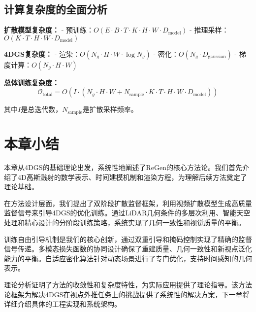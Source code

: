 \subsection{计算复杂度的全面分析}

\textbf{扩散模型复杂度：}
- 预训练：$O(E \cdot B \cdot T \cdot K \cdot H \cdot W \cdot D_{\text{model}})$
- 推理采样：$O(K \cdot T \cdot H \cdot W \cdot D_{\text{model}})$

\textbf{4DGS复杂度：}
- 渲染：$O(N_g \cdot H \cdot W \cdot \log N_g)$
- 密化：$O(N_g \cdot D_{\text{gaussian}})$
- 梯度计算：$O(N_g \cdot H \cdot W)$

\textbf{总体训练复杂度：}
\begin{equation}
\mathcal{O}_{\text{total}} = O(I \cdot (N_g \cdot H \cdot W + N_{\text{sample}} \cdot K \cdot T \cdot H \cdot W \cdot D_{\text{model}}))
\label{eq:total_complexity}
\end{equation}

其中$I$是总迭代数，$N_{\text{sample}}$是扩散采样频率。

\section{本章小结}

本章从4DGS的基础理论出发，系统性地阐述了ReGen的核心方法论。我们首先介绍了4D高斯溅射的数学表示、时间建模机制和渲染方程，为理解后续方法奠定了理论基础。

在方法设计层面，我们提出了双阶段扩散监督框架，利用视频扩散模型生成高质量监督信号来引导4DGS的优化训练。通过LiDAR几何条件的多层次利用、智能天空处理和精心设计的分阶段训练策略，系统实现了几何一致性和视觉质量的平衡。

训练自由引导机制是我们的核心创新，通过双重引导和掩码控制实现了精确的监督信号传递。多模态损失函数的协同设计确保了重建质量、几何一致性和新视点泛化能力的平衡。自适应密化算法针对动态场景进行了专门优化，支持时间感知的几何表示。

理论分析证明了方法的收敛性和复杂度特性，为实际应用提供了理论指导。该方法论框架为解决4DGS在视点外推任务上的挑战提供了系统性的解决方案，下一章将详细介绍具体的工程实现和系统架构。
